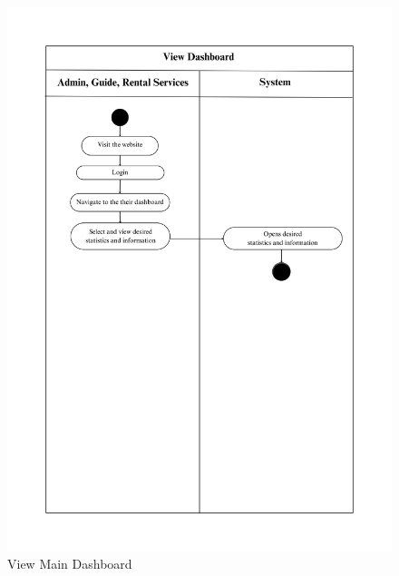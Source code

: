 \begin{figure}[h!]
    \centering
    \includegraphics[width=1\textwidth]{Images/Activity Diagrams/13 View Dashboard.png}
    \caption{View Main Dashboard}
    \label{fig:activity-main-dashboard}
\end{figure}

